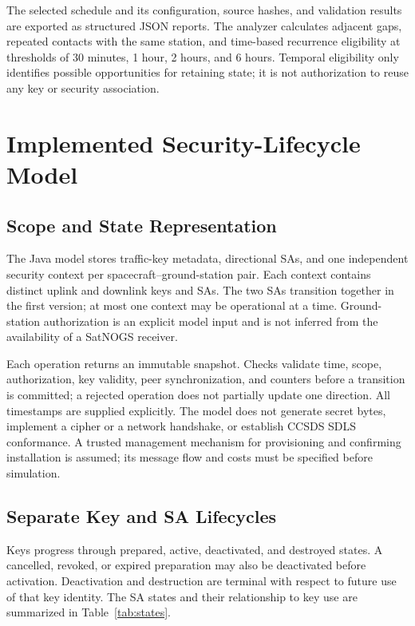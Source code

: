 \documentclass[conference]{IEEEtran}
\begin{document}
The selected schedule and its configuration, source hashes, and validation results are exported as structured JSON reports. The analyzer calculates adjacent gaps, repeated contacts with the same station, and time-based recurrence eligibility at thresholds of 30 minutes, 1 hour, 2 hours, and 6 hours. Temporal eligibility only identifies possible opportunities for retaining state; it is not authorization to reuse any key or security association.

\section{Implemented Security-Lifecycle Model}
\label{sec:lifecycle}
\subsection{Scope and State Representation}
The Java model stores traffic-key metadata, directional SAs, and one independent security context per spacecraft--ground-station pair. Each context contains distinct uplink and downlink keys and SAs. The two SAs transition together in the first version; at most one context may be operational at a time. Ground-station authorization is an explicit model input and is not inferred from the availability of a SatNOGS receiver.

Each operation returns an immutable snapshot. Checks validate time, scope, authorization, key validity, peer synchronization, and counters before a transition is committed; a rejected operation does not partially update one direction. All timestamps are supplied explicitly. The model does not generate secret bytes, implement a cipher or a network handshake, or establish CCSDS SDLS conformance. A trusted management mechanism for provisioning and confirming installation is assumed; its message flow and costs must be specified before simulation.

\subsection{Separate Key and SA Lifecycles}
Keys progress through prepared, active, deactivated, and destroyed states. A cancelled, revoked, or expired preparation may also be deactivated before activation. Deactivation and destruction are terminal with respect to future use of that key identity. The SA states and their relationship to key use are summarized in Table~\ref{tab:states}.
\end{document}
